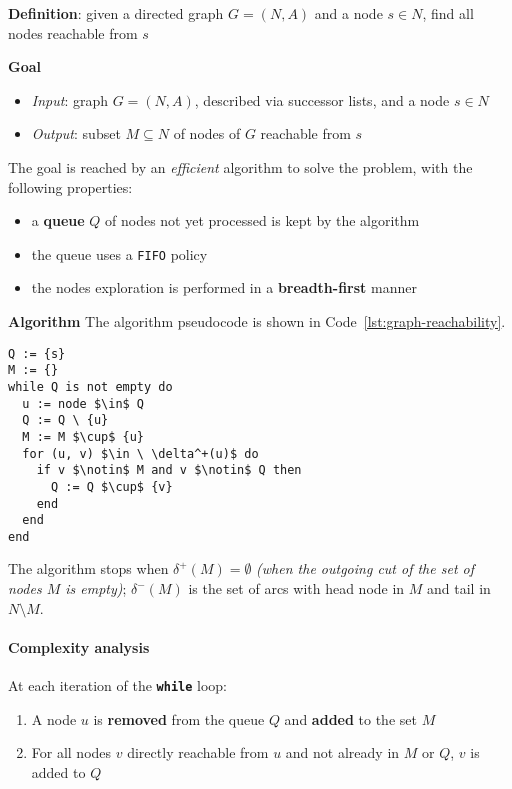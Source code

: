\documentclass[english]{article}
\begin{document}
\textbf{Definition}:
given a directed graph \(G = (N, A)\) and a node \(s \in N\), find all nodes reachable from \(s\)

\bigskip
\textbf{Goal}
\begin{itemize}[label=\(\rightarrow\)]
  \item \textit{Input}: graph \(G = (N, A)\), described via successor lists, and a node \(s \in N\)
  \item \textit{Output}: subset \(M \subseteq N\) of nodes of \(G\) reachable from \(s\)
\end{itemize}

The goal is reached by an \textit{efficient} algorithm to solve the problem, with the following properties:
\begin{itemize}
  \item a \textbf{queue} \(Q\) of nodes not yet processed is kept by the algorithm
  \item the queue uses a \texttt{FIFO} policy
  \item the nodes exploration is performed in a \textbf{breadth-first} manner
\end{itemize}

\bigskip
\textbf{Algorithm}
The algorithm pseudocode is shown in Code~\ref{lst:graph-reachability}.

\begin{lstlisting}[style=custom, language=pseudocode, caption={Graph reachability}, label={lst:graph-reachability}]
Q := {s}
M := {}
while Q is not empty do
  u := node $\in$ Q
  Q := Q \ {u}
  M := M $\cup$ {u}
  for (u, v) $\in \ \delta^+(u)$ do
    if v $\notin$ M and v $\notin$ Q then
      Q := Q $\cup$ {v}
    end
  end
end
\end{lstlisting}

The algorithm stops when \(\delta^+(M) = \emptyset\) \textit{(when the outgoing cut of the set of nodes \(M\) is empty)};
\(\delta^-(M)\) is the set of arcs with head node in \(M\) and tail in \(N \setminus M\).

\paragraph{Complexity analysis}

At each iteration of the \texttt{\textbf{while}} loop:

\begin{enumerate}
  \item A node \(u\) is \textbf{removed} from the queue \(Q\) and \textbf{added} to the set \(M\)
  \item For all nodes \(v\) directly reachable from \(u\) and not already in \(M\) or \(Q\), \(v\) is added to \(Q\)
\end{enumerate}
\end{document}
